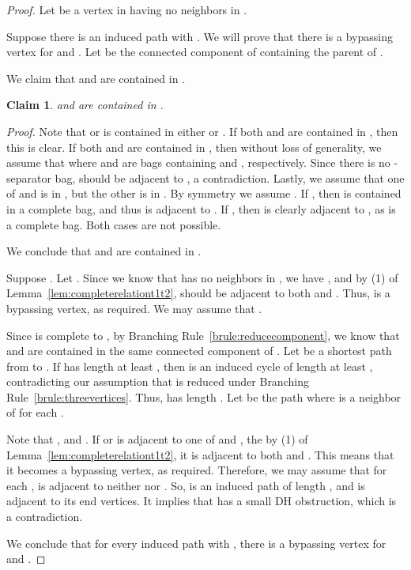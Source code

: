 \documentclass[11pt]{elsarticle}
\newtheorem{claim}{Claim}
\newenvironment{clproof}{\begin{list}{}{\setlength{\leftmargin}{5mm}} \item {\it Proof.} }{\hfill\end{list}\medskip}
\begin{document}
\begin{proof}
Let 
 be a vertex in  having no neighbors in .





Suppose there is an induced path  with . 
We will prove that there is a bypassing vertex for  and .
Let  be the connected component of  containing the parent of .

We claim that  and  are contained in .
\begin{claim}
 and  are contained in .
\end{claim}
\begin{clproof}
Note that  or  is contained in either  or .
If both  and  are contained in , then this is clear.
If both  and  are contained in , then without loss of generality, 
we assume that  where  and  are bags containing  and , respectively.
Since there is no -separator bag,  should be adjacent to , a contradiction.
Lastly, we assume that one of  and  is in , but the other is in .
By symmetry we assume . 
If , then  is contained in a complete bag, and thus  is adjacent to .
If , then  is clearly adjacent to , as  is a complete bag.
Both cases are not possible.

We conclude that  and  are contained in .
\end{clproof}


Suppose . Let .
Since we know that  has no neighbors in , we have , 
and by (1) of Lemma~\ref{lem:completerelationt1t2},
 should be adjacent to both  and . Thus,  is a bypassing vertex, as required.
We may assume that .

Since  is complete to , by Branching Rule~\ref{brule:reducecomponent}, 
we know that  and  are contained in the same connected component of .
Let  be a shortest path from  to .
If  has length at least , then  is an induced cycle of length at least , contradicting our assumption that  is reduced under Branching Rule~\ref{brule:threevertices}.
Thus,  has length . Let  be the path where  is a neighbor of  for each .
 
 Note that ,  and .
 If  or  is adjacent to one of  and , the by (1) of Lemma~\ref{lem:completerelationt1t2}, 
 it is adjacent to both  and .
 This means that it becomes a bypassing vertex, as required. 
 Therefore, we may assume that for each ,  is adjacent to neither  nor .
 So,  is an induced path of length , and  is adjacent to its end vertices. 
 It implies that  has a small DH obstruction, which is a contradiction.


\medskip
We conclude that for every induced path  with , 
  there is a bypassing vertex for  and .
\end{proof}
\end{document}
